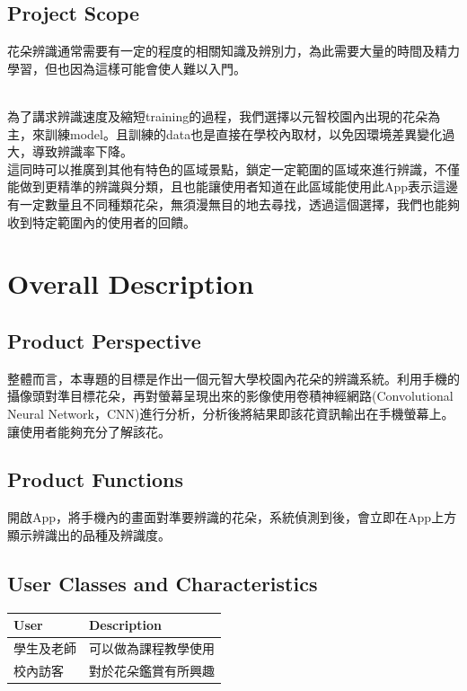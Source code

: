 \documentclass{scrreprt}
\begin{document}
\section{Project Scope}
\begin{CJK}{UTF8}{bkai}
 花朵辨識通常需要有一定的程度的相關知識及辨別力，為此需要大量的時間及精力學習，但也因為這樣可能會使人難以入門。
\end{CJK}
\begin{CJK}{UTF8}{bkai}
\\[6pt] 為了講求辨識速度及縮短training的過程，我們選擇以元智校園內出現的花朵為主，來訓練model。且訓練的data也是直接在學校內取材，以免因環境差異變化過大，導致辨識率下降。 \\[6pt]
這同時可以推廣到其他有特色的區域景點，鎖定一定範圍的區域來進行辨識，不僅能做到更精準的辨識與分類，且也能讓使用者知道在此區域能使用此App表示這邊有一定數量且不同種類花朵，無須漫無目的地去尋找，透過這個選擇，我們也能夠收到特定範圍內的使用者的回饋。
\end{CJK}

\chapter{Overall Description}

\section{Product Perspective}
\begin{CJK}{UTF8}{bkai}
整體而言，本專題的目標是作出一個元智大學校園內花朵的辨識系統。利用手機的攝像頭對準目標花朵，再對螢幕呈現出來的影像使用卷積神經網路(Convolutional Neural Network，CNN)進行分析，分析後將結果即該花資訊輸出在手機螢幕上。讓使用者能夠充分了解該花。
\end{CJK}

\section{Product Functions}
\begin{CJK}{UTF8}{bkai}
	開啟App，將手機內的畫面對準要辨識的花朵，系統偵測到後，會立即在App上方顯示辨識出的品種及辨識度。
\end{CJK}

\section{User Classes and Characteristics}
\begin{center}
	\begin{CJK}{UTF8}{bkai}
		
		\begin{tabular}{| l | l |}
		\hline
			\rowcolor{gray}User & Description \\ \hline
			學生及老師 & 可以做為課程教學使用  \\ \hline
			校內訪客 & 對於花朵鑑賞有所興趣 \\ \hline
		\end{tabular}
	\end{CJK}
\end{center}
\end{document}
